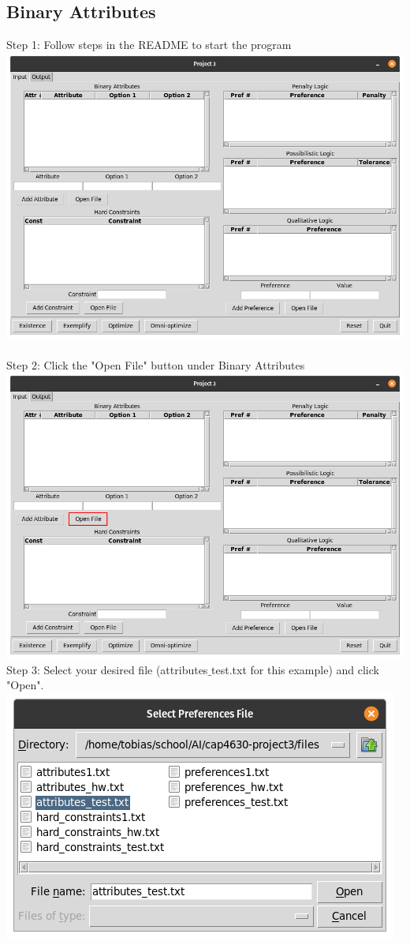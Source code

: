 \documentclass[titlepage]{article}
\begin{document}
\subsection{Binary Attributes}
Step 1: Follow steps in the README to start the program\\
\includegraphics[scale=0.3]{input_start} \\\\
Step 2: Click the "Open File" button under Binary Attributes\\
\includegraphics[scale=0.3]{input_attributes}\newpage
Step 3: Select your desired file (attributes$\_$test.txt for this example) and click "Open".\\
\includegraphics[scale=0.3]{select_attributes}\\
\end{document}
